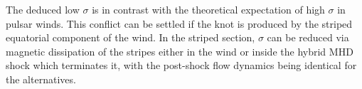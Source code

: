 The deduced low $\sigma$ is in contrast with the theoretical expectation of high $\sigma$ in pulsar winds. This conflict can be settled if the knot is produced by the striped equatorial component of the wind. In the striped section, $\sigma$ can be reduced via
magnetic dissipation of the stripes either in the wind or inside the hybrid MHD shock which terminates it, with the post-shock flow dynamics being identical for the alternatives.  
